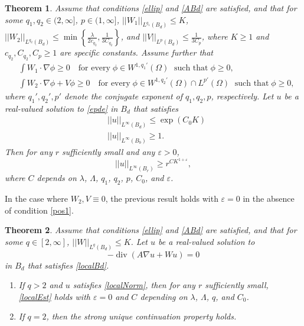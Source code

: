 \documentclass[12pt,reqno]{amsart}
\theoremstyle{plain}
\newtheorem{thm}{Theorem}
\theoremstyle{definition}
\DeclareMathOperator{\di}{div}
\newcommand{\eps}{\varepsilon}
\newcommand{\la}{\lambda}
\newcommand{\La}{\Lambda}
\newcommand{\Om}{\Omega}
\newcommand{\iny}{\infty}
\newcommand{\gr}{\nabla}
\newcommand{\norm}[1]{\left\vert \left\vert #1\right\vert\right\vert}
\newcommand{\set}[1]{\left\{#1\right\}}
\newcommand{\pr}[1]{\left( #1 \right) }
\begin{document}
\begin{thm}
\label{OofV}
Assume that  conditions \eqref{ellip} and \eqref{ABd} are satisfied, and that for some $q_1, q_2 \in (2, \iny]$, $p \in (1, \iny]$, $\norm{W_1}_{L^{q_1}\pr{B_d}} \le K$, $\norm{W_2}_{L^{q_2}\pr{B_d}} \le \min\set{ \frac \la {2 c_{q_2}}, \frac 1 {3 C_{q_2}}}$, and $\norm{V}_{L^p\pr{B_d}}\le \frac 1 {3 C_p}$, where $K \ge 1$ and $c_{q_2}, C_{q_2}, C_p \ge 1$ are specific constants.
Assume further that
\begin{align}
&\int W_1 \cdot \gr \phi \ge 0 \quad \text{for every} \; \phi \in W^{1,q_1'}\pr{\Om} \; \text{ such that} \; \phi \ge 0,
\label{pos1} \\
&\int W_2 \cdot \gr \phi + V \phi \ge 0 \quad \text{for every} \; \phi \in W^{1,q_2'}\pr{\Om} \cap L^{p'}\pr{\Om} \; \text{ such that} \; \phi \ge 0,
\label{pos2}
\end{align}
where $q_1',q_2',p'$ denote the conjugate exponent of $q_1,q_2,p$, respectively. Let $u$ be a real-valued solution to \eqref{epde} in $B_d$ that satisfies 
\begin{align}
& \norm{u}_{L^\iny\pr{B_d}} \le \exp\pr{C_0 K}
\label{localBd} \\
& \norm{u}_{L^\iny\pr{B_b}} \ge 1. 
\label{localNorm}
\end{align}
Then for any $r$ sufficiently small and any $\eps > 0$, 
\begin{equation}
\norm{u}_{L^\iny\pr{B_r}} \ge r^{C K^{1+\eps}},
\label{localEst}
\end{equation}
where $C$ depends on $\la$, $\La$, $q_1$, $q_2$, $p$, $C_0$, and $\eps$.
\end{thm}

In the case where $W_2, V \equiv 0$, the previous result holds with $\eps = 0$ in the absence of condition \eqref{pos1}.

\begin{thm}
\label{OofV1}
Assume that  conditions \eqref{ellip} and \eqref{ABd} are satisfied, and that for some $q \in [2, \iny]$, $\norm{W}_{L^{q}\pr{B_d}} \le K$.
Let $u$ be a real-valued solution to 
\begin{equation}
- \di\pr{A \gr u + W u}  = 0
\label{epde2}
\end{equation}
in $B_d$ that satisfies \eqref{localBd}. 
\begin{enumerate}
\item[{\rm (a)}] If $q > 2$ and $u$ satisfies \eqref{localNorm}, then for any $r$ sufficiently small, \eqref{localEst} holds with $\eps = 0$ and $C$ depending on $\la$, $\La$, $q$, and $C_0$.
\item[{\rm (b)}] If $q = 2$, then the strong unique continuation property holds.
\end{enumerate}
\end{thm}
\end{document}

